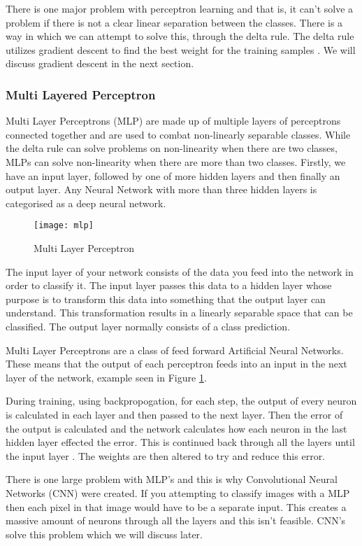 There is one major problem with perceptron learning and that is, it can't solve
a problem if there is not a clear linear separation between the classes. There
is a way in which we can attempt to solve this, through the delta rule. The
delta rule utilizes gradient descent to find the best weight for the training
samples \parencite{MLANN}. We will discuss gradient descent in the next section.

\subsubsection*{Multi Layered Perceptron}
Multi Layer Perceptrons (MLP) are made up of multiple layers of perceptrons connected
together and are used to combat non-linearly separable classes.
While the delta rule can solve problems on non-linearity when there are two classes, MLPs can solve non-linearity when there are more than two classes.
Firstly, we have an input layer, followed by one of more hidden layers and then
finally an output layer.
Any Neural Network with more than three hidden layers is categorised as a deep neural network.

\begin{figure}[h]
    \texttt{[image: mlp]}
     \caption{Multi Layer Perceptron}
     \label{fig:mlp}
\end{figure}

The input layer of your network consists of the data you feed into the network
in order to classify it. The input layer passes this data to a hidden layer
whose purpose is to transform this data into something that the output layer can
understand. This transformation results in a linearly separable space that can be classified. The output layer normally consists of a class prediction.

Multi Layer Perceptrons are a class of feed forward Artificial Neural Networks.
These means that the output of each perceptron feeds into an input in the next
layer of the network, example seen in Figure \ref{fig:mlp}.

During training, using backpropogation, for each step, the output of every neuron is calculated in each layer and then passed to the next layer. Then the error of the output is calculated and the network calculates how each neuron in the last hidden layer effected the error. This is continued back through all the layers until the input layer \parencite{handsOnML}. The weights are then altered to try and reduce this error.

There is one large problem with MLP's and this is why Convolutional Neural
Networks (CNN) were created. If you attempting to classify images with a MLP then
each pixel in that image would have to be a separate input. This creates a
massive amount of neurons through all the layers and this isn't feasible. CNN's
solve this problem which we will discuss later.


